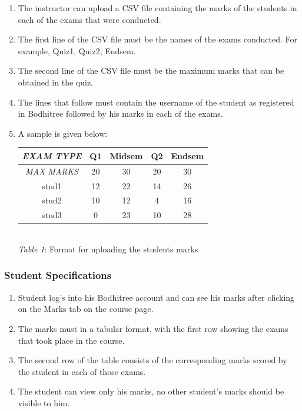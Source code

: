 \begin{enumerate}
	\item The instructor can upload a CSV file containing the marks of the students in each of the exams that were conducted.
	\item The first line of the CSV file must be the names of the exams conducted. For example, Quiz1, Quiz2, Endsem.
	\item The second line of the CSV file must be the maximum marks that can be obtained in the quiz.
	\item The lines that follow must contain the username of the student as registered in Bodhitree followed by his marks in each of the exams.
	\item A sample is given below:
	
	\begin{center}
	\def\arraystretch{1.5}
	\begin{tabular}{|c|c|c|c|c|}
	\hline \textit{EXAM TYPE} & Q1 & Midsem & Q2 & Endsem \\ 
	\hline \textit{MAX MARKS} & 20 & 30 & 20 & 30 \\ 
	\hline stud1 & 12 & 22 & 14 & 26 \\
	\hline stud2 & 10 & 12 & 4 & 16 \\
	\hline stud3 & 0 & 23 & 10 & 28 \\
	\hline 
	\end{tabular} 
	\\ 	\vspace{0.2in} \textit{Table 1}: Format for uploading the students marks
	\end{center}
	
\end{enumerate}

\subsubsection{Student Specifications}

\begin{enumerate}
	\item Student log's into his Bodhitree account and can see his marks after clicking on the Marks tab on the course page.
	\item The marks must in a tabular format, with the first row showing the exams that took place in the course.
	\item The second row of the table consists of the corresponding marks scored by the student in each of those exams.
	\item The student can view only his marks, no other student's marks should be visible to him.
\end{enumerate}

